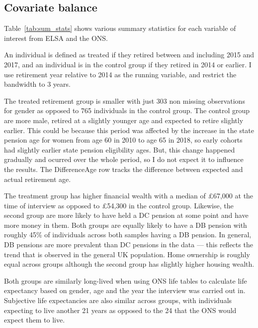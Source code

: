 \documentclass[12pt]{article}
\begin{document}


\subsection{Covariate balance}

Table~\ref{tab:sum_stats} shows various summary statistics for each variable of interest from ELSA and the ONS.

An individual is defined as treated if they retired between and including 2015 and 2017, and an individual is in the control group if they retired in 2014 or earlier. I use retirement year relative to 2014 as the running variable, and restrict the bandwidth to 3 years.

The treated retirement group is smaller with just 303 non missing observations for gender as opposed to 765 individuals in the control group.
The control group are more male, retired at a slightly younger age and expected to retire slightly earlier.
This could be because this period was affected by the increase in the
state pension age for women from age 60 in 2010 to age 65 in 2018, so early cohorts had slightly earlier state pension eligibility ages.
But, this change happened gradually and ocurred over the whole period, so I do not expect it to influence the results.
The DifferenceAge row tracks the difference between expected and actual retirement age.

The treatment group has higher financial wealth with a median of £67,000 at the
time of interview as opposed to £54,300 in the control group. Likewise, the
second group are more likely to have held a DC pension at some point and have
more money in them. Both groups are equally likely to have a DB pension with
roughly 45\% of individuals across both samples having a DB pension. In general,
DB pensions are more prevalent than DC pensions in the data --- this reflects the
trend that is observed in the general UK population. Home ownership is roughly
equal across groups although the second group has slightly higher housing
wealth.

Both groups are similarly long-lived when using ONS life tables to calculate
life expectancy based on gender, age and the year the interview was carried out
in. Subjective life expectancies are also similar across groups, with
individuals expecting to live another 21 years as opposed to the 24 that the ONS
would expect them to live.
\end{document}
